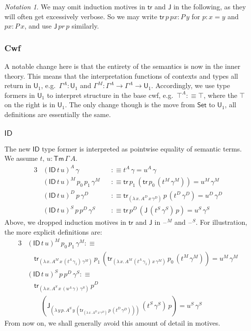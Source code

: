 \documentclass[12pt,a4paper,twoside,openany]{book}
\theoremstyle{remark}
\newtheorem{notation}{Notation}
\theoremstyle{definition}
\theoremstyle{theorem}
\newcommand{\mi}[1]{\mathit{#1}}
\newcommand{\ms}[1]{\mathsf{#1}}
\newcommand{\bs}[1]{\boldsymbol{#1}}
\newcommand{\tr}{\ms{tr}}
\newcommand{\J}{\ms{J}}
\newcommand{\Tm}{\mathsf{Tm}}
\newcommand{\U}{\mathsf{U}}
\newcommand{\ID}{\mathsf{ID}}
\newcommand{\blank}{\mathord{\hspace{1pt}\text{--}\hspace{1pt}}}
\newcommand{\Set}{\mathsf{Set}}
\newcommand{\defn}{:\equiv}
\begin{document}
\begin{notation}
We may omit induction motives in $\tr$ and $\J$ in the following, as they will
often get excessively verbose. So we may write $\tr\,p\,\mi{px} : P\,y$ for $p :
x = y$ and $\mi{px} : P\,x$, and use $\J\,\mi{pr}\,p$ similarly.
\end{notation}

\subsubsection{Cwf}

A notable change here is that the entirety of the semantics is now in the inner
theory. This means that the interpretation functions of contexts and types all
return in $\U_1$, e.g.\ $\Gamma^A : \U_1$ and $\Gamma^M : \Gamma^A \to \Gamma^A
\to \U_1$. Accordingly, we use type formers in $\U_1$ to interpret structure in
the base cwf, e.g.\ $\top^A \defn \top$, where the $\top$ on the right is in
$\U_1$. The only change though is the move from $\Set$ to $\U_1$, all
definitions are essentially the same.

\subsubsection{$\bs{\ID}$}

The new $\ID$ type former is interpreted as pointwise equality of semantic
terms. We assume $t,\,u : \Tm\,\Gamma\,A$.
\begin{alignat*}{3}
  &(\ID\,t\,u)^A\,\gamma            &&\defn t^A\,\gamma = u^A\,\gamma \\
  &(\ID\,t\,u)^M\,p_0\,p_1\,\gamma^M &&\defn \tr\,p_1\,(\tr\,p_0\,(t^M\,\gamma^M)) = u^M\,\gamma^M\\
  &(\ID\,t\,u)^D\,p\,\gamma^D       &&\defn \tr_{(\lambda\,x.\,A^D\,x\,\gamma^D)}\,p\,(t^D\,\gamma^D) = u^D\,\gamma^D\\
  &(\ID\,t\,u)^S\,p\,p^D\,\gamma^S  &&\defn \tr\,p^D\,(\J\,(t^S\,\gamma^S)\,p) = u^S\,\gamma^S
\end{alignat*}
Above, we dropped induction motives in $\tr$ and $\J$ in $\blank^M$ and
$\blank^S$. For illustration, the more explicit definitions are:
\begin{alignat*}{3}
  &(\ID\,t\,u)^M\,p_0\,p_1\,\gamma^M \defn\\
  &\hspace{1em}\tr_{(\lambda\,x.\,A^M\,x\,(t^A\,\gamma_1)\,\gamma^M)}\,p_1\, (\tr_{(\lambda\,x.\,A^M\,(t^A\,\gamma_1)\,x\,\gamma^M)}\,p_0\,(t^M\,\gamma^M)) = u^M\,\gamma^M\\
  &(\ID\,t\,u)^S\,p\,p^D\,\gamma^S \defn\\
  &\hspace{1em}\tr_{(\lambda\,x.\,A^S\,x\,(u^A\,\gamma)\,\gamma^S)}\,p^D\\
  &\hspace{2em}(\J_{(\lambda\,y\,p.\,A^S\,y\,(\tr_{(\lambda\,x.\,A^D\,x\,\gamma^D)}\,p\,(t^D\,\gamma^D)))}\,(t^S\,\gamma^S)\,p) = u^S\,\gamma^S
\end{alignat*}
From now on, we shall generally avoid this amount of detail in motives.
\end{document}
